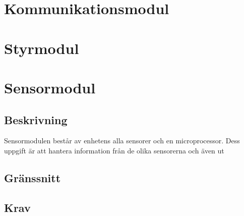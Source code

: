 \documentclass[krav.tex]{subfiles}
\begin{document}
\section{Kommunikationsmodul}

\section{Styrmodul}

\section{Sensormodul}
\subsection{Beskrivning}
Sensormodulen består av enhetens alla sensorer och en microprocessor. Dess
uppgift är att hantera information från de olika sensorerna och även
ut
\subsection{Gränssnitt}
\subsection{Krav}
\end{document}

